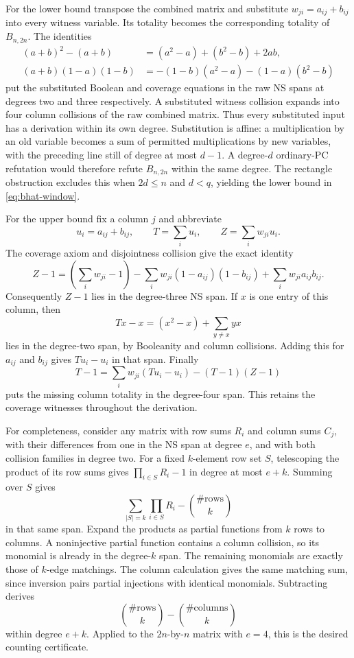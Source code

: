 For the lower bound transpose the combined matrix and substitute
$w_{ji}=a_{ij}+b_{ij}$ into every witness variable. Its totality becomes
the corresponding totality of $B_{n,2n}$. The identities
\begin{align*}
(a+b)^2-(a+b)&=(a^2-a)+(b^2-b)+2ab,\\
(a+b)(1-a)(1-b)&=-(1-b)(a^2-a)-(1-a)(b^2-b)
\end{align*}
put the substituted Boolean and coverage equations in the raw NS spans
at degrees two and three respectively. A substituted witness collision
expands into four column collisions of the raw combined matrix.
Thus every substituted input has a derivation within its own degree.
Substitution is affine: a multiplication by an old variable becomes a
sum of permitted multiplications by new variables, with the preceding
line still of degree at most $d-1$. A degree-$d$ ordinary-PC refutation
would therefore refute $B_{n,2n}$ within the same degree. The rectangle
obstruction excludes this when $2d\le n$ and $d<q$, yielding the lower
bound in \eqref{eq:bhat-window}.

For the upper bound fix a column $j$ and abbreviate
\[
 u_i=a_{ij}+b_{ij},\qquad T=\sum_i u_i,\qquad
 Z=\sum_i w_{ji}u_i.
\]
The coverage axiom and disjointness collision give the exact identity
\[
 Z-1=(\sum_iw_{ji}-1)
 -\sum_iw_{ji}(1-a_{ij})(1-b_{ij})
 +\sum_iw_{ji}a_{ij}b_{ij}.
\]
Consequently $Z-1$ lies in the degree-three NS span. If $x$ is one entry
of this column, then
\[
 Tx-x=(x^2-x)+\sum_{y\ne x}yx
\]
lies in the degree-two span, by Booleanity and column collisions.
Adding this for $a_{ij}$ and $b_{ij}$ gives $Tu_i-u_i$ in that span.
Finally
\[
 T-1=\sum_iw_{ji}(Tu_i-u_i)-(T-1)(Z-1)
\]
puts the missing column totality in the degree-four span. This retains
the coverage witnesses throughout the derivation.

For completeness, consider any matrix with row sums $R_i$ and column
sums $C_j$, with their differences from one in the NS span at degree
$e$, and with both collision families in degree two. For a fixed
$k$-element row set $S$, telescoping the product of its row sums gives
$\prod_{i\in S}R_i-1$ in degree at most $e+k$. Summing over $S$ gives
\[
 \sum_{|S|=k}\prod_{i\in S}R_i-\binom{\#\mathrm{rows}}k
\]
in that same span. Expand the products as partial functions from $k$
rows to columns. A noninjective partial function contains a column
collision, so its monomial is already in the degree-$k$ span.
The remaining monomials are exactly those of $k$-edge matchings.
The column calculation gives the same matching sum, since inversion
pairs partial injections with identical monomials. Subtracting derives
\[
 \binom{\#\mathrm{rows}}k-\binom{\#\mathrm{columns}}k
\]
within degree $e+k$. Applied to the $2n$-by-$n$ matrix with $e=4$, this
is the desired counting certificate.

